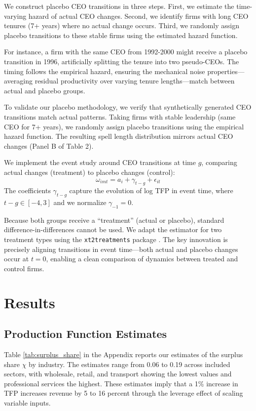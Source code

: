\documentclass[11pt,a4paper]{article}
\begin{document}
We construct placebo CEO transitions in three steps. First, we estimate the time-varying hazard of actual CEO changes. Second, we identify firms with long CEO tenures (7+ years) where no actual change occurs. Third, we randomly assign placebo transitions to these stable firms using the estimated hazard function.

For instance, a firm with the same CEO from 1992-2000 might receive a placebo transition in 1996, artificially splitting the tenure into two pseudo-CEOs. The timing follows the empirical hazard, ensuring the mechanical noise properties—averaging residual productivity over varying tenure lengths—match between actual and placebo groups.

To validate our placebo methodology, we verify that synthetically generated CEO transitions match actual patterns. Taking firms with stable leadership (same CEO for 7+ years), we randomly assign placebo transitions using the empirical hazard function. The resulting spell length distribution mirrors actual CEO changes (Panel B of Table 2).

We implement the event study around CEO transitions at time $g$, comparing actual changes (treatment) to placebo changes (control):
\begin{equation}
\omega_{imt} = a_i + \gamma_{t-g} + \epsilon_{it}
\end{equation}
The coefficients $\gamma_{t-g}$ capture the evolution of log TFP in event time, where $t-g \in [-4, 3]$ and we normalize $\gamma_{-1} = 0$.

Because both groups receive a ``treatment'' (actual or placebo), standard difference-in-differences cannot be used. We adapt the \citet{Callaway2021JoLE} estimator for two treatment types using the \texttt{xt2treatments} package \citep{Koren2024xt2treatments}. The key innovation is precisely aligning transitions in event time—both actual and placebo changes occur at $t=0$, enabling a clean comparison of dynamics between treated and control firms.


\section{Results}

\subsection{Production Function Estimates}

Table \ref{tab:surplus_share} in the Appendix reports our estimates of the surplus share $\chi$ by industry. The estimates range from 0.06 to 0.19 across included sectors, with wholesale, retail, and transport showing the lowest values and professional services the highest. These estimates imply that a 1\% increase in TFP increases revenue by 5 to 16 percent through the leverage effect of scaling variable inputs.
\end{document}
